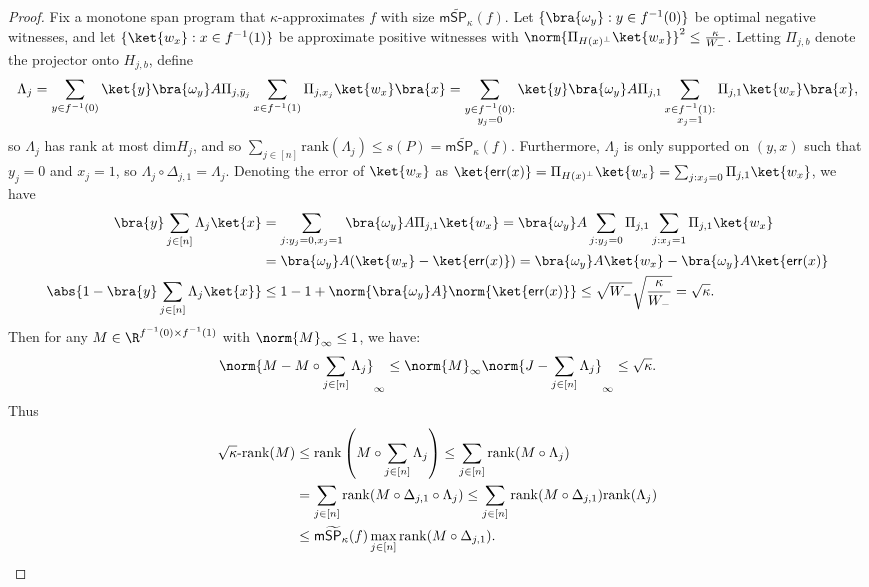 \documentclass{toc}
\begin{document}
\begin{proof}
Fix a monotone span program that $\kappa$-approximates $f$ with size $\mathsf{m}\widetilde{\mathsf{SP}}_\kappa(f)$. Let $\{\bra{\omega_y}: y\in f^{-1}(0)\}$ be optimal negative witnesses, and let $\{\ket{w_x}:x\in f^{-1}(1)\}$ be approximate positive witnesses with $\norm{\Pi_{H(x)^\bot}\ket{w_x}}^2\leq \frac{\kappa}{W_-}$. Letting $\Pi_{j,b}$ denote the projector onto $H_{j,b}$, define 
$$\Lambda_j=\sum_{y\in f^{-1}(0)}\ket{y}\bra{\omega_y}A\Pi_{j,\bar{y}_j}\sum_{x\in f^{-1}(1)}\Pi_{j,x_j}\ket{w_x}\bra{x}
=\sum_{\substack{y\in f^{-1}(0):\\ y_j=0}}\ket{y}\bra{\omega_y}A\Pi_{j,1}\sum_{\substack{x\in f^{-1}(1):\\ x_j=1}}\Pi_{j,1}\ket{w_x}\bra{x},$$
so $\Lambda_j$ has rank at most $\mathrm{dim}H_j$, and so $\sum_{j\in [n]}\mathrm{rank}(\Lambda_j)\leq s(P) = \mathsf{m}\widetilde{\mathsf{SP}}_\kappa(f)$. Furthermore, $\Lambda_j$ is only supported on $(y,x)$ such that $y_j=0$ and $x_j=1$, so $\Lambda_j\circ \Delta_{j,1}=\Lambda_j$. Denoting the error of $\ket{w_x}$ as $\ket{\mathsf{err}(x)}=\Pi_{H(x)^\bot}\ket{w_x}=\sum_{j:x_j=0}\Pi_{j,1}\ket{w_x}$, we have
\begin{align*}
\bra{y}\sum_{j\in [n]}\Lambda_j\ket{x} &= \sum_{j:y_j=0,x_j=1}\bra{\omega_y} A\Pi_{j,1}\ket{w_x}
=\bra{\omega_y}A\sum_{j:y_j=0}\Pi_{j,1}\sum_{j:x_j=1}\Pi_{j,1}\ket{w_x}\\
&=\bra{\omega_y}A(\ket{w_x}-\ket{\mathsf{err}(x)})
=\bra{\omega_y}A\ket{w_x}-\bra{\omega_y}A\ket{\mathsf{err}(x)}\\
\abs{1-\bra{y}\sum_{j\in [n]}\Lambda_j\ket{x}}&\leq 1-1+\norm{\bra{\omega_y}A}\norm{\ket{\mathsf{err}(x)}} \leq \sqrt{W_-}\sqrt{\frac{\kappa}{W_-}}=\sqrt{\kappa}.
\end{align*}
Then for any $M\in \R^{f^{-1}(0)\times f^{-1}(1)}$ with $\norm{M}_\infty\leq 1$, we have:
$$\norm{M-M\circ \sum_{j\in[n]}\Lambda_j}_\infty\leq \norm{M}_\infty\norm{J-\sum_{j\in [n]}\Lambda_j}_\infty\leq \sqrt{\kappa}.$$
Thus
\begin{align*}
\sqrt{\kappa}\mbox{-rank}(M) &\leq  \mathrm{rank}\left(M\circ \sum_{j\in [n]}\Lambda_j\right)\leq \sum_{j\in [n]}\mathrm{rank}(M\circ\Lambda_j)\\
&= \sum_{j\in [n]}\mathrm{rank}(M\circ \Delta_{j,1}\circ\Lambda_j) \leq \sum_{j\in [n]}\mathrm{rank}(M\circ \Delta_{j,1})\mathrm{rank}(\Lambda_j)\\
&\leq  \mathsf{m}\widetilde{\mathsf{SP}}_\kappa(f)\max_{j\in [n]}\mathrm{rank}(M\circ\Delta_{j,1}).\qedhere
\end{align*}
\end{proof}
\end{document}
